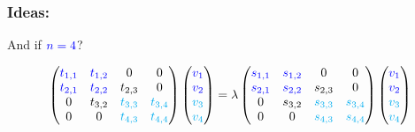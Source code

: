 \documentclass{beamer}
\theoremstyle{definition} \newtheorem{de}{Def}
\theoremstyle{remark} \newtheorem{os}[de]{Remark}
\theoremstyle{plain} \newtheorem{te}[de]{Teo}
\theoremstyle{plain} \newtheorem{co}[de]{Cor}
\theoremstyle{plain} \newtheorem{pr}[de]{Prop}
\theoremstyle{plain} \newtheorem{lem}[de]{Lemm}
\theoremstyle{remark} \newtheorem{rem}[de]{Remark}
\begin{document}
\begin{frame}
  \frametitle{Ideas:}

  And if $\textcolor{blue}{n=4}$?
  
  \begin{equation*}
    \begin{pmatrix}
      \textcolor{blue}{t_{1,1}} & \textcolor{blue}{t_{1,2}} & 0 & 0\\
      \textcolor{blue}{t_{2,1}} & \textcolor{blue}{t_{2,2}} & t_{2,3} & 0\\
      0 & t_{3,2} & \textcolor{cyan}{t_{3,3}} & \textcolor{cyan}{t_{3,4}}\\
      0 & 0 & \textcolor{cyan}{t_{4,3}} & \textcolor{cyan}{t_{4,4}}
    \end{pmatrix} \begin{pmatrix} 
      \textcolor{blue}{v_1} \\ 
      \textcolor{blue}{v_2} \\
      \textcolor{cyan}{v_3} \\
      \textcolor{cyan}{v_4}
    \end{pmatrix} = \lambda \begin{pmatrix}
      \textcolor{blue}{s_{1,1}} & \textcolor{blue}{s_{1,2}} & 0 & 0\\
      \textcolor{blue}{s_{2,1}} & \textcolor{blue}{s_{2,2}} & s_{2,3} & 0\\
      0 & s_{3,2} & \textcolor{cyan}{s_{3,3}} & \textcolor{cyan}{s_{3,4}}\\
      0 & 0 & \textcolor{cyan}{s_{4,3}} & \textcolor{cyan}{s_{4,4}}
    \end{pmatrix} \begin{pmatrix}
      \textcolor{blue}{v_1} \\ 
      \textcolor{blue}{v_2} \\
      \textcolor{cyan}{v_3} \\
      \textcolor{cyan}{v_4}
    \end{pmatrix}
  \end{equation*}

\end{frame}
\end{document}
